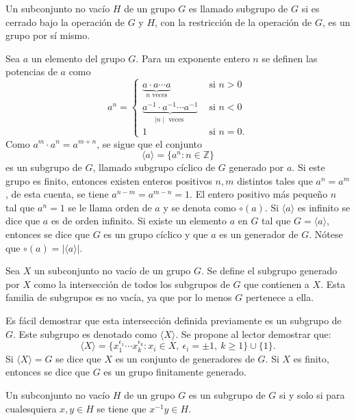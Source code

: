 \begin{definicion}
Un subconjunto no vacío $H$ de un grupo $G$ es llamado subgrupo de $G$ si es cerrado bajo la operación de $G$ y $H$, con la restricción de la operación de $G$, es un grupo por sí mismo.
\end{definicion}
\begin{ejemplo}
Sea $a$ un elemento del grupo $G$. Para un exponente entero $n$ se definen las potencias de $a$ como
\[ a^n = \left\{ \begin{array}{lr}
\underset{n\mbox{ veces}}{\underbrace{a \cdot a \cdots a}} & \mbox{ si } n >0\\
\underset{\mid n \mid \mbox{ veces }}{\underbrace{a^{-1}\cdot a^{-1}\cdots a^{-1}}} & \mbox{ si } n<0 \\
1 & \mbox{ si } n = 0.
\end{array} \right.  \]
Como $a^m \cdot a^n = a^{m+n}$, se sigue que el conjunto
\[\langle a \rangle = \{ a^n : n \in \mathds{Z} \} \]
es un subgrupo de $G$, llamado subgrupo cíclico de $G$ generado por $a$.
Si este grupo es finito, entonces existen enteros positivos $n,m$ distintos tales que $a^n = a^m$, de esta cuenta, se tiene $a^{n-m} = a^{m-n} = 1$. El entero positivo más pequeño $n$  tal que $a^n = 1$ se le llama orden de $a$ y se denota como $\circ(a)$. Si $\langle a \rangle$ es infinito se dice que $a$ es de orden infinito.
Si existe un elemento $a$ en $G$ tal que $G = \langle a \rangle$, entonces se dice que $G$ es un grupo cíclico y que $a$ es un generador de $G$. Nótese que $\circ(a) = | \langle a \rangle | $.
\end{ejemplo}
\begin{ejemplo}
Sea $X$ un subconjunto no vacío de un grupo $G$. Se define el subgrupo generado por $X$ como la intersección de todos los subgrupos de $G$ que contienen a $X$. Esta familia de subgrupos es no vacía, ya que por lo menos $G$ pertenece a ella. 

Es fácil demostrar que esta intersección definida previamente es un subgrupo de $G$. Este subgrupo es denotado como $\langle X \rangle$. Se propone al lector demostrar que: 
\[ \langle X \rangle = \{ x_1^{\epsilon_1} \cdots x_k^{\epsilon_k} \colon x_i \in X, \ \epsilon_i = \pm 1, \ k \geq 1 \} \cup \{1\} .\]
Si $\langle X \rangle = G$ se dice que $X$ es un conjunto de generadores de $G$. Si $X$ es finito, entonces se dice que $G$ es un grupo finitamente generado.
\end{ejemplo}
 \begin{lema}
 Un subconjunto no vacío $H$ de un grupo $G$ es un subgrupo de $G$ si y solo si para cualesquiera $x,y \in H$ se tiene que $x^{-1}y \in H$.
 \end{lema}
